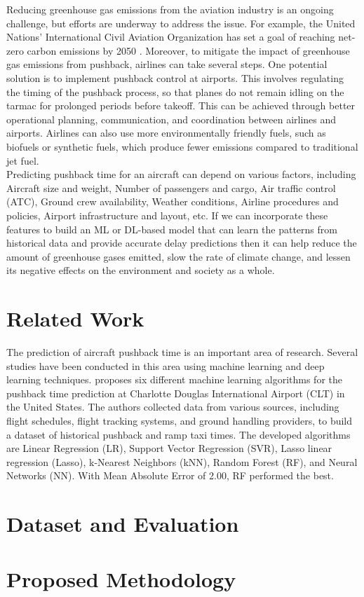 \documentclass[11pt]{article}
\begin{document}
Reducing greenhouse gas emissions from the aviation industry is an ongoing challenge, but efforts are underway to address the issue. For example, the United Nations' International Civil Aviation Organization has set a goal of reaching net-zero carbon emissions by 2050 \cite{icao}. Moreover, to mitigate the impact of greenhouse gas emissions from pushback, airlines can take several steps. One potential solution is to implement pushback control at airports. This involves regulating the timing of the pushback process, so that planes do not remain idling on the tarmac for prolonged periods before takeoff. This can be achieved through better operational planning, communication, and coordination between airlines and airports. Airlines can also use more environmentally friendly fuels, such as biofuels or synthetic fuels, which produce fewer emissions compared to traditional jet fuel. \\

Predicting pushback time for an aircraft can depend on various factors, including Aircraft size and weight, Number of passengers and cargo, Air traffic control (ATC), Ground crew availability, Weather conditions, Airline procedures and policies, Airport infrastructure and layout, etc. If we can incorporate these features to build an ML or DL-based model that can learn the patterns from historical data and provide accurate delay predictions then it can help reduce the amount of greenhouse gases emitted, slow the rate of climate change, and lessen its negative effects on the environment and society as a whole.


\section{Related Work}

The prediction of aircraft pushback time is an important area of research. Several studies have been conducted in this area using machine learning and deep learning techniques. \cite{lee2019prediction} proposes six different machine learning algorithms for the pushback time prediction at Charlotte Douglas International Airport (CLT) in the United States. The authors collected data from various sources, including flight schedules, flight tracking systems, and ground handling providers, to build a dataset of historical pushback and ramp taxi times. The developed algorithms
are Linear Regression (LR), Support Vector Regression (SVR), Lasso linear regression (Lasso), k-Nearest Neighbors (kNN), Random Forest (RF), and Neural Networks (NN). With Mean Absolute Error of 2.00, RF performed the best.

\section{Dataset and Evaluation}

\section{Proposed Methodology}




\end{document}
